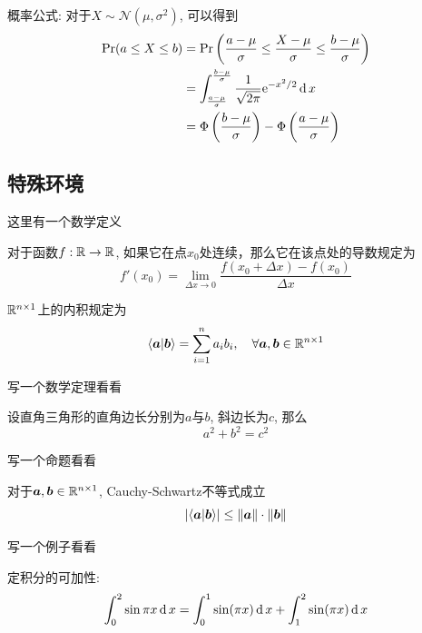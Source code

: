 概率公式: 对于$X\sim \mathcal{N}(\mu, \sigma^2)$, 可以得到
\begin{align}
\operatorname{\mathrm{Pr}}(a \le X \le b) 
&=\operatorname{\mathrm{Pr}}\left(\frac{a-\mu}{\sigma}\le \frac{X-\mu}{\sigma}\le
  \frac{b-\mu}{\sigma} \right) \\
&= \int^{\frac{b-\mu}{\sigma}}_{\frac{a-\mu}{\sigma}} \frac{1}{\sqrt{2\pi}}\mathrm{e}^{-x^2/2}\operatorname{\mathrm{d}} x \\
& = \Phi\left(\frac{b-\mu}{\sigma}\right) - \Phi\left(\frac{a-\mu}{\sigma}\right) 
\end{align}


\subsection{特殊环境}


这里有一个数学定义
\begin{definition}
对于函数$f: \mathbb{R} \to \mathbb{R}$, 如果它在点$x_0$处连续，那么它在该点处的导数规定为
\begin{equation}
f'(x_0) = \lim_{\Delta x\to 0} \frac{f(x_0 + \Delta x) - f(x_0)}{\Delta x}
\end{equation}
\end{definition}

\begin{definition}[内积]
$\mathbb{R}^{{n}\times {1}}$上的内积规定为
\begin{equation}
\langle \bm{a} | \bm{b} \rangle = \sum^n_{i=1} a_ib_i, \quad \forall \bm{a}, \bm{b}\in \mathbb{R}^{{n}\times {1}}
\end{equation}
\end{definition}

写一个数学定理看看
\begin{theorem}
设直角三角形的直角边长分别为$a$与$b$, 斜边长为$c$, 那么
\begin{equation}
a^2 + b^2 = c^2
\end{equation}
\end{theorem}


写一个命题看看
\begin{proposition}
对于$\bm{a},\bm{b}\in \mathbb{R}^{{n}\times {1}}$, Cauchy-Schwartz不等式成立
\begin{equation}
\left| \langle \bm{a} | \bm{b} \rangle \right|\le \left\lVert \bm{a} \right\rVert\cdot \left\lVert \bm{b} \right\rVert
\end{equation}
\end{proposition}



写一个例子看看

\begin{example}
定积分的可加性:
$$
\int^2_0 \sin \pi x \operatorname{\mathrm{d}} x = \int^1_0 \sin(\pi x) \operatorname{\mathrm{d}} x + \int^2_1 \sin(\pi x) \operatorname{\mathrm{d}} x
$$
\end{example}

